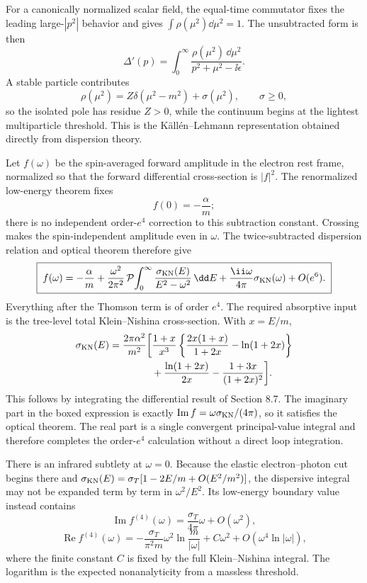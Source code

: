 \begin{enumerate}
For a canonically normalized scalar field, the equal-time commutator fixes
the leading large-\(|p^2|\) behavior and gives
\(\int\rho(\mu^2)\dd\mu^2=1\).  The unsubtracted form is then
\[
 \boxed{\;
 \Delta'(p)=\int_0^\infty
 \frac{\rho(\mu^2)\,\dd\mu^2}
 {p^2+\mu^2-\ii\epsilon}.\;}
\]
A stable particle contributes
\[
 \rho(\mu^2)=Z\delta(\mu^2-m^2)+\sigma(\mu^2),
\qquad \sigma\geq0,
\]
so the isolated pole has residue \(Z>0\), while the continuum begins at
the lightest multiparticle threshold.  This is the
K\"all\'en--Lehmann representation obtained directly from dispersion
theory.

Let \(f(\omega)\) be the spin-averaged forward amplitude in the electron
rest frame, normalized so that the forward differential cross-section is
\(|f|^2\).  The renormalized low-energy theorem fixes
\[
 f(0)=-\frac{\alpha}{m};
\]
there is no independent order-\(e^4\) correction to this subtraction
constant.  Crossing makes the spin-independent amplitude even in
\(\omega\).  The twice-subtracted dispersion relation and optical theorem
therefore give
\[
 \boxed{\;
 f(\omega)=-\frac{\alpha}{m}
 +\frac{\omega^2}{2\pi^2}\,
 \mathcal P\!\int_0^\infty
 \frac{\sigma_{\rm KN}(E)}{E^2-\omega^2}\,\dd E
 +\frac{\ii\omega}{4\pi}\sigma_{\rm KN}(\omega)
 +O(e^6).\;}
\]
Everything after the Thomson term is of order \(e^4\).  The required
absorptive input is the tree-level total Klein--Nishina cross-section.
With \(x=E/m\),
\[
 \begin{split}
 \sigma_{\rm KN}(E)=\frac{2\pi\alpha^2}{m^2}\biggl[
 &\frac{1+x}{x^3}
 \left\{\frac{2x(1+x)}{1+2x}-\ln(1+2x)\right\}\\
 &+\frac{\ln(1+2x)}{2x}
 -\frac{1+3x}{(1+2x)^2}
 \biggr].
 \end{split}
\]
This follows by integrating the differential result of Section 8.7.
The imaginary part in the boxed expression is exactly
\(\operatorname{Im}f=\omega\sigma_{\rm KN}/(4\pi)\), so it satisfies the
optical theorem.  The real part is a single convergent principal-value
integral and therefore completes the order-\(e^4\) calculation without a
direct loop integration.

There is an infrared subtlety at \(\omega=0\).  Because the elastic
electron--photon cut begins there and
\(\sigma_{\rm KN}(E)=\sigma_T[1-2E/m+O(E^2/m^2)]\), the dispersive
integral may not be expanded term by term in \(\omega^2/E^2\).  Its
low-energy boundary value instead contains
\[
 \operatorname{Im}f^{(4)}(\omega)
 =\frac{\sigma_T}{4\pi}\omega+O(\omega^2),
\]
\[
 \operatorname{Re}f^{(4)}(\omega)
 =-\frac{\sigma_T}{\pi^2m}\omega^2
 \ln\frac{m}{|\omega|}+C\omega^2+O(\omega^4\ln|\omega|),
\]
where the finite constant \(C\) is fixed by the full Klein--Nishina
integral.  The logarithm is the expected nonanalyticity from a massless
threshold.
\end{enumerate}
